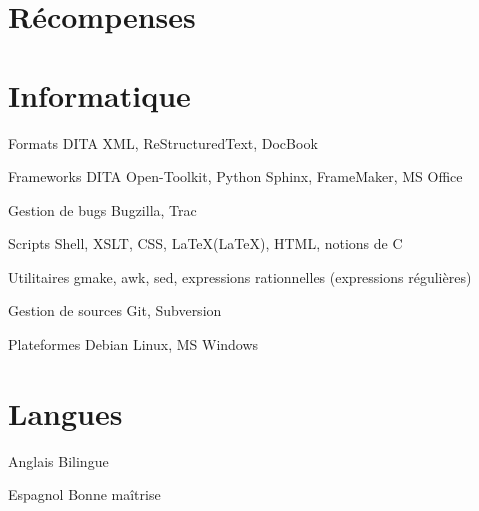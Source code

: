 \documentclass[12pt,a4paper,roman]{moderncv}
\begin{document}

\section{Récompenses}



\section{Informatique}

\cvitem
    {Formats}
    {DITA XML, ReStructuredText, DocBook}

\cvitem
    {Frameworks}
    {DITA Open-Toolkit, Python Sphinx, FrameMaker, MS Office}

\cvitem
    {Gestion de bugs}
    {Bugzilla, Trac}

 {Scripts Shell, XSLT, CSS, \LaTeX (LaTeX), HTML, notions de
  C}

\cvitem
    {Utilitaires}
    {gmake, awk, sed, expressions rationnelles (expressions
      régulières)}

\cvitem
    {Gestion de sources}
    {Git, Subversion}

\cvitem
    {Plateformes}
    {Debian Linux, MS Windows}

\section{Langues}

\cvitem
    {Anglais}
    {Bilingue}

\cvitem
    {Espagnol}
    {Bonne maîtrise}

\end{document}
